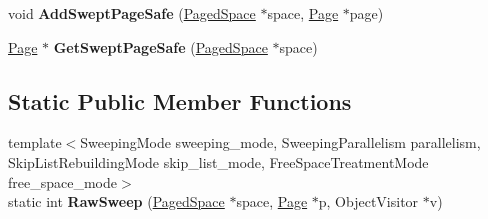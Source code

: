 \begin{DoxyCompactItemize}
\item 
void {\bfseries Add\+Swept\+Page\+Safe} (\hyperlink{classv8_1_1internal_1_1_paged_space}{Paged\+Space} $\ast$space, \hyperlink{classv8_1_1internal_1_1_page}{Page} $\ast$page)\hypertarget{classv8_1_1internal_1_1_mark_compact_collector_1_1_sweeper_a842249b6edeb21e89d0cf7dcb03f9696}{}\label{classv8_1_1internal_1_1_mark_compact_collector_1_1_sweeper_a842249b6edeb21e89d0cf7dcb03f9696}

\item 
\hyperlink{classv8_1_1internal_1_1_page}{Page} $\ast$ {\bfseries Get\+Swept\+Page\+Safe} (\hyperlink{classv8_1_1internal_1_1_paged_space}{Paged\+Space} $\ast$space)\hypertarget{classv8_1_1internal_1_1_mark_compact_collector_1_1_sweeper_a4bfd95fb8004dba5b4c04aeaebf93e6f}{}\label{classv8_1_1internal_1_1_mark_compact_collector_1_1_sweeper_a4bfd95fb8004dba5b4c04aeaebf93e6f}

\end{DoxyCompactItemize}
\subsection*{Static Public Member Functions}
\begin{DoxyCompactItemize}
\item 
{\footnotesize template$<$Sweeping\+Mode sweeping\+\_\+mode, Sweeping\+Parallelism parallelism, Skip\+List\+Rebuilding\+Mode skip\+\_\+list\+\_\+mode, Free\+Space\+Treatment\+Mode free\+\_\+space\+\_\+mode$>$ }\\static int {\bfseries Raw\+Sweep} (\hyperlink{classv8_1_1internal_1_1_paged_space}{Paged\+Space} $\ast$space, \hyperlink{classv8_1_1internal_1_1_page}{Page} $\ast$p, Object\+Visitor $\ast$v)\hypertarget{classv8_1_1internal_1_1_mark_compact_collector_1_1_sweeper_a3f4272148222117840a48a262596d3f1}{}\label{classv8_1_1internal_1_1_mark_compact_collector_1_1_sweeper_a3f4272148222117840a48a262596d3f1}

\end{DoxyCompactItemize}
